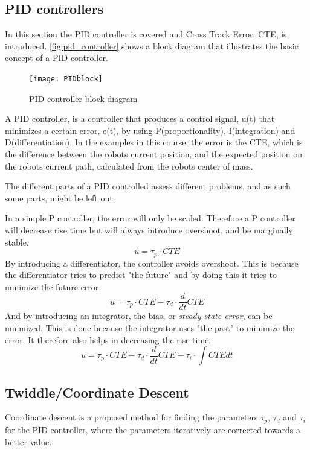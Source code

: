 \documentclass[Main]{subfiles}
\begin{document}
\subsection{PID controllers}
In this section the PID controller is covered and Cross Track Error, CTE, is introduced.
\autoref{fig:pid_controller} shows a block diagram that illustrates the basic concept of a PID controller.
\begin{figure}[H]
	\centering
	\texttt{[image: PIDblock]}
	\caption{PID controller block diagram}
	\label{fig:pid_controller}
\end{figure}\noindent
A PID controller, is a controller that produces a control signal, u(t)  that minimizes a certain error, e(t), by using P(proportionality), I(integration) and D(differentiation). 
In the examples in this course, the error is the CTE, which is the difference between the robots current position, and the expected position on the robots current path, calculated from the robots center of mass.

The different parts of a PID controlled assess different problems, and as such some parts, might be left out.

In a simple P controller, the error will only be scaled. 
Therefore a P controller will decrease rise time but will always introduce overshoot, and be marginally stable.
\begin{equation}
	u = \tau_p \cdot CTE
\end{equation}
By introducing a differentiator, the controller avoids overshoot.
This is because the differentiator tries to predict "the future" and by doing this it tries to minimize the future error.
\begin{equation}
	u = \tau_p \cdot CTE - \tau_d \cdot \frac{d}{dt} CTE
\end{equation}
And by introducing an integrator, the bias, or \emph{steady state error}, can be mnimized.
This is done because the integrator uses "the past" to minimize the error.
It therefore also helps in decreasing the rise time.
\begin{equation}
	u = \tau_p \cdot CTE - \tau_d \cdot \frac{d}{dt} CTE - \tau_i \cdot \int CTE dt
\end{equation}

\newpage
\subsection{Twiddle/Coordinate Descent}

Coordinate descent is a proposed method for finding the parameters $\tau_p$, $\tau_d$ and $\tau_i$ for the PID controller, where the parameters iteratively are corrected towards a better value.
\end{document}
